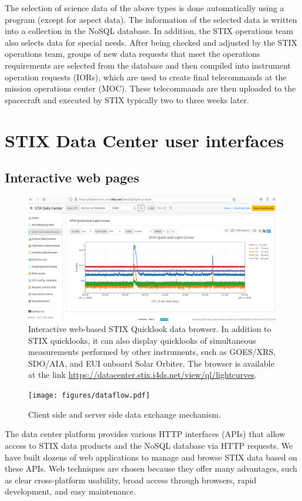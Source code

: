 \documentclass[referee]{aa} %
\begin{document}
The selection of science data of the above types is done automatically using a program (except for aspect data). The information of the selected data is written into a collection in the NoSQL database.  In addition, the STIX operations team also selects data for special 
needs.  After being checked and adjusted by the STIX operations team, groups of new data requests that meet the operations requirements are selected from the database and then compiled into instrument operation requests (IORs), which are used to create final telecommands at the mission operations center (MOC). 
These telecommands are then uploaded to the spacecraft and executed by STIX typically two to three weeks later. 

\section{STIX Data Center user interfaces}
\subsection{Interactive web pages}


\begin{figure}[ht]
  \centering
  \includegraphics[width=0.95\linewidth]{figures/data-browser.pdf}
  \caption{ 
    Interactive web-based STIX Quicklook data browser. 
    In addition to STIX quicklooks, it can also display quicklooks of simultaneous measurements  performed by other instruments, such as GOES/XRS, SDO/AIA, and EUI onboard Solar Orbiter.     The browser is available at the link \url{https://datacenter.stix.i4ds.net/view/ql/lightcurves}.}
  \label{fig:qlbrowser}
\end{figure}
\begin{figure}[ht]
  \centering
  \texttt{[image: figures/dataflow.pdf]}
  \caption{ 
   Client side and server side data exchange mechanism. 
  }
  \label{fig:interfaces}
\end{figure}
The data center platform provides various HTTP interfaces (APIs) that allow access to STIX data products
and the NoSQL database via HTTP requests. 
We have built dozens of web applications to manage and browse STIX data based on these APIs. 
Web techniques are chosen because they offer many advantages, such as clear cross-platform 
usability, broad access through browsers, rapid development, and easy maintenance.
\end{document}
